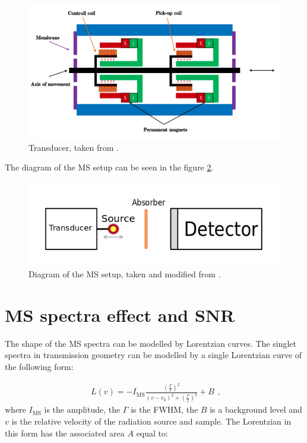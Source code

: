 \begin{figure}[H]
 \centering
 \includegraphics[scale=0.4, angle = 0]{./pictures/transducer}
 \caption{Transducer, taken from \cite{STEJSKAL2019thesis}.}
 \label{transducer}
 
\end{figure}


The diagram of the MS setup can be seen in the figure \ref{diagram}.

\begin{figure}[H]
 \centering
 \includegraphics[scale=0.8, angle = 0]{./pictures/MSsetup.png}
 \caption{Diagram of the MS setup, taken and modified from \cite{NOVAK2016thesis}.}
 \label{diagram}
 
\end{figure}


\section{MS spectra effect and SNR}
The shape of the MS spectra can be modelled by Lorentzian curves. The singlet spectra in transmission geometry can be modelled by a single Lorentzian curve of the following form:

\begin{equation}
\begin{aligned}
L(v) = -I_{\textrm{MS}}\frac{(\frac{\Gamma}{2})^2}{(v - v_0)^2 + (\frac{\Gamma}{2})^2} + B
\end{aligned},
\label{lor}
\end{equation}
where $I_{\textrm{MS}}$ is the amplitude, the $\Gamma$ is the FWHM, the $B$ is a background level and $v$ is the relative velocity of the radiation source and sample. The Lorentzian in this form has the associated area $A$ equal to:

